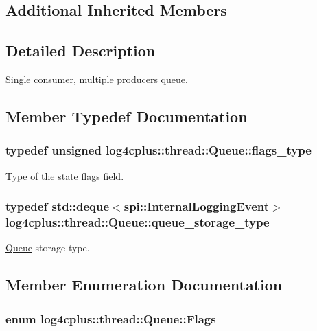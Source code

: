 \subsection*{Additional Inherited Members}


\subsection{Detailed Description}
Single consumer, multiple producers queue. 

\subsection{Member Typedef Documentation}
\hypertarget{classlog4cplus_1_1thread_1_1Queue_a6abff6eb8b4963c0ecf3e1ed67622490}{
\subsubsection[{flags\-\_\-type}]{\setlength{\rightskip}{0pt plus 5cm}typedef unsigned {\bf log4cplus\-::thread\-::\-Queue\-::flags\-\_\-type}}}\label{classlog4cplus_1_1thread_1_1Queue_a6abff6eb8b4963c0ecf3e1ed67622490}


Type of the state flags field. 

\hypertarget{classlog4cplus_1_1thread_1_1Queue_af9d2a870aac3a6cbf38e702bcc163741}{
\subsubsection[{queue\-\_\-storage\-\_\-type}]{\setlength{\rightskip}{0pt plus 5cm}typedef std\-::deque$<${\bf spi\-::\-Internal\-Logging\-Event}$>$ {\bf log4cplus\-::thread\-::\-Queue\-::queue\-\_\-storage\-\_\-type}}}\label{classlog4cplus_1_1thread_1_1Queue_af9d2a870aac3a6cbf38e702bcc163741}


\hyperlink{classlog4cplus_1_1thread_1_1Queue}{Queue} storage type. 



\subsection{Member Enumeration Documentation}
\hypertarget{classlog4cplus_1_1thread_1_1Queue_a8807c511ce07e59b470ae6ab03d9c552}{
\subsubsection[{Flags}]{\setlength{\rightskip}{0pt plus 5cm}enum {\bf log4cplus\-::thread\-::\-Queue\-::\-Flags}}}\label{classlog4cplus_1_1thread_1_1Queue_a8807c511ce07e59b470ae6ab03d9c552}


